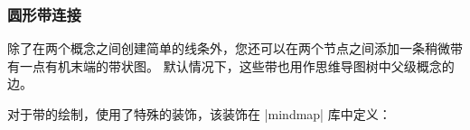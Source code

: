 \subsubsection{圆形带连接}


除了在两个概念之间创建简单的线条外，您还可以在两个节点之间添加一条稍微带有一点有机末端的带状图。 默认情况下，这些带也用作思维导图树中父级概念的边。


对于带的绘制，使用了特殊的装饰，该装饰在 |mindmap| 库中定义：

